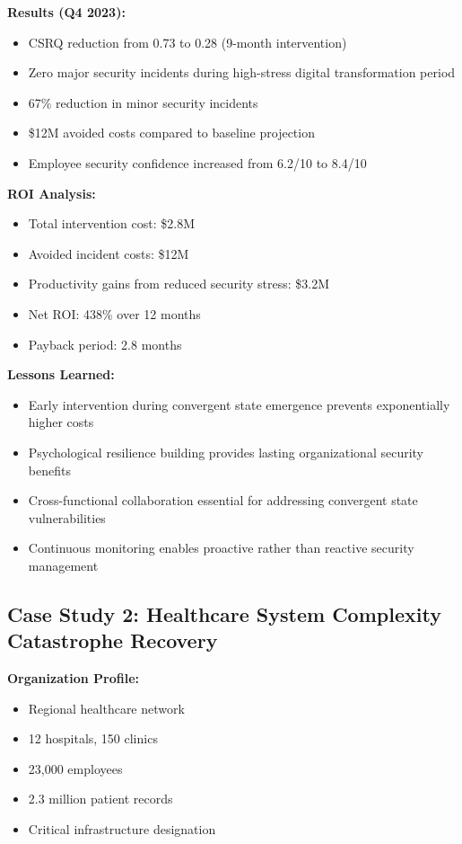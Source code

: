 \documentclass[11pt,a4paper]{article}
\begin{document}
\textbf{Results (Q4 2023):}
\begin{itemize}
\item CSRQ reduction from 0.73 to 0.28 (9-month intervention)
\item Zero major security incidents during high-stress digital transformation period
\item 67\% reduction in minor security incidents
\item \$12M avoided costs compared to baseline projection
\item Employee security confidence increased from 6.2/10 to 8.4/10
\end{itemize}

\textbf{ROI Analysis:}
\begin{itemize}
\item Total intervention cost: \$2.8M
\item Avoided incident costs: \$12M
\item Productivity gains from reduced security stress: \$3.2M
\item Net ROI: 438\% over 12 months
\item Payback period: 2.8 months
\end{itemize}

\textbf{Lessons Learned:}
\begin{itemize}
\item Early intervention during convergent state emergence prevents exponentially higher costs
\item Psychological resilience building provides lasting organizational security benefits
\item Cross-functional collaboration essential for addressing convergent state vulnerabilities
\item Continuous monitoring enables proactive rather than reactive security management
\end{itemize}

\subsection{Case Study 2: Healthcare System Complexity Catastrophe Recovery}

\textbf{Organization Profile:}
\begin{itemize}
\item Regional healthcare network
\item 12 hospitals, 150 clinics
\item 23,000 employees
\item 2.3 million patient records
\item Critical infrastructure designation
\end{itemize}
\end{document}
